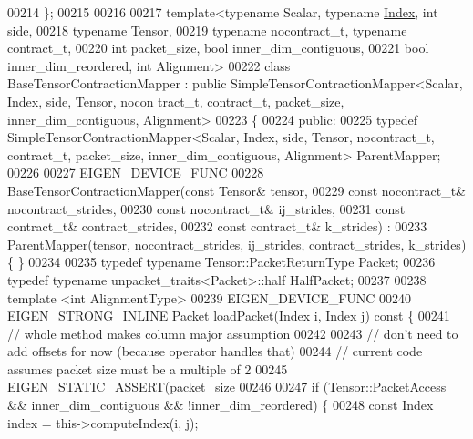 \begin{DoxyCode}
00214 \};
00215 
00216 
00217 \textcolor{keyword}{template}<\textcolor{keyword}{typename} Scalar, \textcolor{keyword}{typename} \hyperlink{namespace_eigen_a62e77e0933482dafde8fe197d9a2cfde}{Index}, \textcolor{keywordtype}{int} side,
00218          \textcolor{keyword}{typename} Tensor,
00219          \textcolor{keyword}{typename} nocontract\_t, \textcolor{keyword}{typename} contract\_t,
00220          \textcolor{keywordtype}{int} packet\_size, \textcolor{keywordtype}{bool} inner\_dim\_contiguous,
00221          \textcolor{keywordtype}{bool} inner\_dim\_reordered, \textcolor{keywordtype}{int} Alignment>
00222 \textcolor{keyword}{class }BaseTensorContractionMapper : \textcolor{keyword}{public} SimpleTensorContractionMapper<Scalar, Index, side, Tensor, nocon
      tract\_t, contract\_t, packet\_size, inner\_dim\_contiguous, Alignment>
00223 \{
00224  \textcolor{keyword}{public}:
00225   \textcolor{keyword}{typedef} SimpleTensorContractionMapper<Scalar, Index, side, Tensor, nocontract\_t, contract\_t, packet\_size,
       inner\_dim\_contiguous, Alignment> ParentMapper;
00226 
00227   EIGEN\_DEVICE\_FUNC
00228   BaseTensorContractionMapper(\textcolor{keyword}{const} Tensor& tensor,
00229                               \textcolor{keyword}{const} nocontract\_t& nocontract\_strides,
00230                               \textcolor{keyword}{const} nocontract\_t& ij\_strides,
00231                               \textcolor{keyword}{const} contract\_t& contract\_strides,
00232                               \textcolor{keyword}{const} contract\_t& k\_strides) :
00233   ParentMapper(tensor, nocontract\_strides, ij\_strides, contract\_strides, k\_strides) \{ \}
00234 
00235   \textcolor{keyword}{typedef} \textcolor{keyword}{typename} Tensor::PacketReturnType Packet;
00236   \textcolor{keyword}{typedef} \textcolor{keyword}{typename} unpacket\_traits<Packet>::half HalfPacket;
00237 
00238   \textcolor{keyword}{template} <\textcolor{keywordtype}{int} AlignmentType>
00239   EIGEN\_DEVICE\_FUNC
00240   EIGEN\_STRONG\_INLINE Packet loadPacket(Index i, Index j)\textcolor{keyword}{ const }\{
00241     \textcolor{comment}{// whole method makes column major assumption}
00242 
00243     \textcolor{comment}{// don't need to add offsets for now (because operator handles that)}
00244     \textcolor{comment}{// current code assumes packet size must be a multiple of 2}
00245     EIGEN\_STATIC\_ASSERT(packet\_size %
00246 
00247     \textcolor{keywordflow}{if} (Tensor::PacketAccess && inner\_dim\_contiguous && !inner\_dim\_reordered) \{
00248       \textcolor{keyword}{const} Index index = this->computeIndex(i, j);

\end{DoxyCode}
